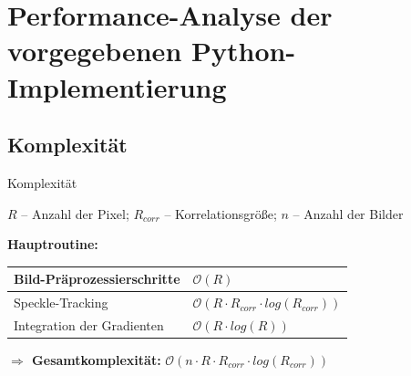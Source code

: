 
\section{Performance-Analyse der vorgegebenen Python-Implementierung}

\subsection{Komplexität}
\begin{frame}{Komplexität}
	\begin{center}
		$ R $ -- Anzahl der Pixel; $ R_{corr} $ -- Korrelationsgröße; $ n $ -- Anzahl der Bilder \\
	\end{center}
	\textbf{Hauptroutine:} \\
	\setlength\extrarowheight{5pt}
	\begin{center}
		\begin{tabular}{| >{\centering\arraybackslash}m{4cm} | >{\centering\arraybackslash}m{5cm} |}
			\hline
			Bild-Präprozessierschritte & $ \mathcal{O}(R) $ \\ \hline
			Speckle-Tracking & $ \mathcal{O}\left(R \cdot R_{corr} \cdot log\left(R_{corr}\right)\right)$ \\ \hline
			Integration der Gradienten & $ \mathcal{O}(R \cdot log(R)) $ \\ \hline
		\end{tabular}
	\end{center}
	\vspace{.5cm}
	\textbf{$ \Rightarrow $ Gesamtkomplexität:} $ \mathcal{O}\left(n \cdot R \cdot R_{corr} \cdot log\left(R_{corr}\right)\right)$
\end{frame}

